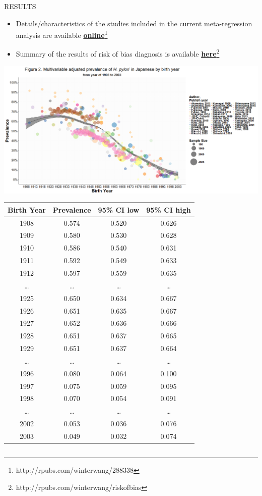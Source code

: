 \documentclass[english,xcolor=table,t
]{beamer}
\begin{document}
\begin{frame}
\begin{columns}
\begin{block}{RESULTS}
\begin{itemize}
\item
  Details/characteristics of the studies included in the current
  meta-regression analysis are available
  \href{http://rpubs.com/winterwang/288338}{\textbf{online}}\footnote{http://rpubs.com/winterwang/288338}
\item
  Summary of the results of risk of bias diagnosis is available
  \href{http://rpubs.com/winterwang/riskofbias}{\textbf{here}}\footnote{http://rpubs.com/winterwang/riskofbias}
\end{itemize}

{\centering\includegraphics[]{images/main.png}
\par}

\begin{table}[]
\centering
{}
\label{my-label}
\begin{tabular}{@{}cccc@{}}
\toprule
Birth Year & Prevalence & 95\% CI low & 95\% CI high \\ \midrule
1908 & 0.574 & 0.520 & 0.626 \\
1909 & 0.580 & 0.530 & 0.628 \\
1910 & 0.586 & 0.540 & 0.631 \\
1911 & 0.592 & 0.549 & 0.633 \\
1912 & 0.597 & 0.559 & 0.635 \\
\dots & \dots & \dots & \dots \\
1925 & 0.650 & 0.634 & 0.667 \\
1926 & 0.651 & 0.635 & 0.667 \\
\rowcolor[HTML]{F8FF00} 
1927 & 0.652 & 0.636 & 0.666 \\
1928 & 0.651 & 0.637 & 0.665 \\
1929 & 0.651 & 0.637 & 0.664 \\
\dots & \dots & \dots & \dots \\
\rowcolor[HTML]{F8FF00} 
1996 & 0.080 & 0.064 & 0.100 \\
1997 & 0.075 & 0.059 & 0.095 \\
1998 & 0.070 & 0.054 & 0.091 \\
\dots & \dots & \dots & \dots \\
2002 & 0.053 & 0.036 & 0.076 \\
2003 & 0.049 & 0.032 & 0.074 \\ \bottomrule
\end{tabular}
\end{table}


\end{block}
\end{columns}
\end{frame}
\end{document}
